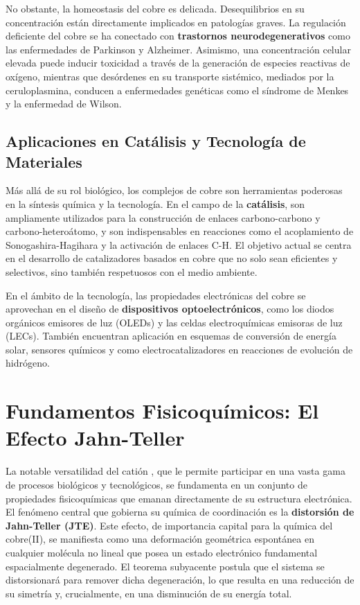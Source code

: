 No obstante, la homeostasis del cobre es delicada. Desequilibrios en su concentración están directamente implicados en patologías graves. La regulación deficiente del cobre se ha conectado con \textbf{trastornos neurodegenerativos} como las enfermedades de Parkinson y Alzheimer. Asimismo, una concentración celular elevada puede inducir toxicidad a través de la generación de especies reactivas de oxígeno, mientras que desórdenes en su transporte sistémico, mediados por la ceruloplasmina, conducen a enfermedades genéticas como el síndrome de Menkes y la enfermedad de Wilson.


\subsection{Aplicaciones en Catálisis y Tecnología de Materiales}

Más allá de su rol biológico, los complejos de cobre son herramientas poderosas en la síntesis química y la tecnología. En el campo de la \textbf{catálisis}, son ampliamente utilizados para la construcción de enlaces carbono-carbono y carbono-heteroátomo, y son indispensables en reacciones como el acoplamiento de Sonogashira-Hagihara y la activación de enlaces C-H. El objetivo actual se centra en el desarrollo de catalizadores basados en cobre que no solo sean eficientes y selectivos, sino también respetuosos con el medio ambiente.

En el ámbito de la tecnología, las propiedades electrónicas del cobre se aprovechan en el diseño de \textbf{dispositivos optoelectrónicos}, como los diodos orgánicos emisores de luz (OLEDs) y las celdas electroquímicas emisoras de luz (LECs). También encuentran aplicación en esquemas de conversión de energía solar, sensores químicos y como electrocatalizadores en reacciones de evolución de hidrógeno.


\section{Fundamentos Fisicoquímicos: El Efecto Jahn-Teller}

La notable versatilidad del catión , que le permite participar en una vasta gama de procesos biológicos y tecnológicos, se fundamenta en un conjunto de propiedades fisicoquímicas que emanan directamente de su estructura electrónica. El fenómeno central que gobierna su química de coordinación es la \textbf{distorsión de Jahn-Teller (JTE)}. Este efecto, de importancia capital para la química del cobre(II), se manifiesta como una deformación geométrica espontánea en cualquier molécula no lineal que posea un estado electrónico fundamental espacialmente degenerado. El teorema subyacente postula que el sistema se distorsionará para remover dicha degeneración, lo que resulta en una reducción de su simetría y, crucialmente, en una disminución de su energía total.

